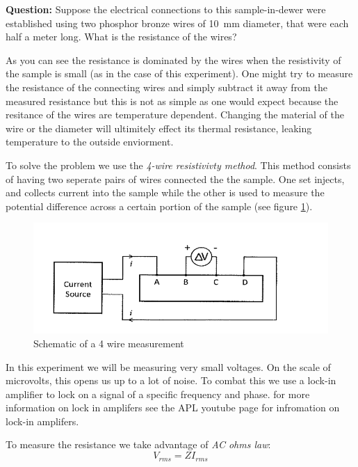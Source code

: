\documentclass{apl-guide}
\begin{document}
\vspace{10pt}
\begin{minipage}{0.8\textwidth}
\textbf{Question:} Suppose the electrical connections to this sample-in-dewer
  were established using two phosphor bronze wires of \SI{10}{\mm} diameter,
  that were each half a meter long. What is the resistance of the wires?
\end{minipage}
\vspace{10pt}

As you can see the resistance is dominated by the wires when the resistivity
of the sample is small (as in the case of this experiment). One might try to
measure the resistance of the connecting wires and simply subtract it away from
the measured resistance but this is not as simple as one would expect because the
resitance of the wires are temperature dependent. Changing the material of the
wire or the diameter will ultimitely effect its thermal resistance, leaking
temperature to the outside enviorment. 

To solve the problem we use the \emph{4-wire resistivivty method}. This method
consists of having two seperate pairs of wires connected the the sample. One set
injects, and collects current into the sample while the other is used to measure
the potential difference across a certain portion of the sample
(see figure \ref{fig:4_wire}).
\begin{figure}
  \includegraphics{4_wire_diagram}
  \caption{\label{fig:4_wire} Schematic of a 4 wire measurement}
\end{figure}

In this experiment we will be measuring very small voltages. On the scale of
microvolts, this opens us up to a lot of noise. To combat this we use a lock-in
amplifier to lock on a signal of a specific frequency and phase.
for more information on lock in amplifers see the 
APL youtube page for infromation on lock-in amplifers. 

To measure the resistance we take advantage of \emph{AC ohms law}: 
\begin{equation}
  V_{rms} = Z I_{rms}
\end{equation}
\end{document}
